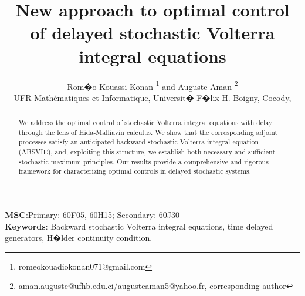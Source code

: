 \documentclass[12pt]{article}
\theoremstyle{remark}
\numberwithin{equation}{section}
\begin{document}
		
\title{New approach to optimal control of delayed stochastic Volterra integral equations}
		
\author{Rom�o Kouassi Konan \thanks{romeokouadiokonan071@gmail.com}\;\; and \; Auguste Aman \thanks{aman.auguste@ufhb.edu.ci/augusteaman5@yahoo.fr, corresponding author}\\
UFR Math\'{e}matiques et Informatique, Universit� F�lix H. Boigny, Cocody,\;\;\;\;\;\;\;\;\;\;\\}
		
\date{}
\maketitle \thispagestyle{empty} \setcounter{page}{1}
		
\thispagestyle{fancy} \fancyhead{}
\fancyfoot{}
\renewcommand{\headrulewidth}{0pt}
		
\begin{abstract}
We address the optimal control of stochastic Volterra integral equations with delay through the lens of Hida-Malliavin calculus. We show that the corresponding adjoint processes satisfy an anticipated backward stochastic Volterra integral equation (ABSVIE), and, exploiting this structure, we establish both necessary and sufficient stochastic maximum principles. Our results provide a comprehensive and rigorous framework for characterizing optimal controls in delayed stochastic systems.
\end{abstract}
	
\vspace{.08in} \noindent \textbf{MSC}:Primary: 60F05, 60H15; Secondary: 60J30\\
\vspace{.08in} \noindent \textbf{Keywords}: Backward stochastic Volterra integral equations, time delayed generators, H�lder continuity condition.
			
\end{document}
